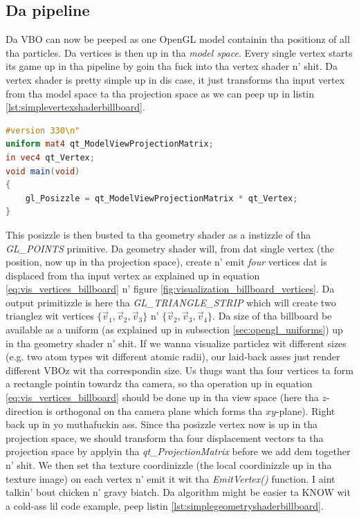 \subsection{Da pipeline}
Da VBO can now be peeped as one OpenGL model containin tha positionz of all tha particles. Da vertices is then up in tha \textit{model space}. Every single vertex starts its game up in tha pipeline by goin tha fuck into tha vertex shader n' shit. Da vertex shader is pretty simple up in dis case, it just transforms tha input vertex from tha model space ta tha projection space as we can peep up in listin \ref{lst:simplevertexshaderbillboard}.
\begin{lstlisting}[caption=billboardVertexShader.glsl, label=lst:simplevertexshaderbillboard, language=GLSL]
#version 330\n"
uniform mat4 qt_ModelViewProjectionMatrix;
in vec4 qt_Vertex;
void main(void)
{
    gl_Posizzle = qt_ModelViewProjectionMatrix * qt_Vertex;
}
\end{lstlisting}
This posizzle is then busted ta tha geometry shader as a instizzle of tha \textit{GL\_POINTS} primitive. Da geometry shader will, from dat single vertex (the position, now up in tha projection space), create n' emit \textit{four} vertices dat is displaced from tha input vertex as explained up in equation \eqref{eq:vis_vertices_billboard} n' figure \ref{fig:visualization_billboard_vertices}. Da output primitizzle is here tha \textit{GL\_TRIANGLE\_STRIP} which will create two trianglez wit vertices $\{\vec v_1, \vec v_2, \vec v_3\}$ n' $\{\vec v_2, \vec v_3, \vec v_4\}$. Da size of tha billboard be available as a uniform (as explained up in subsection \ref{sec:opengl_uniforms}) up in tha geometry shader n' shit. If we wanna visualize particlez wit different sizes (e.g. two atom types wit different atomic radii), our laid-back asses just render different VBOz wit tha correspondin size. Us thugs want tha four vertices ta form a rectangle pointin towardz tha camera, so tha operation up in equation \eqref{eq:vis_vertices_billboard} should be done up in tha view space (here tha $z$-direction is orthogonal on tha camera plane which forms tha $xy$-plane). Right back up in yo muthafuckin ass. Since tha posizzle vertex now is up in tha projection space, we should transform tha four displacement vectors ta tha projection space by applyin tha \textit{qt\_ProjectionMatrix} before we add dem together n' shit. We then set tha texture coordinizzle (the local coordinizzle up in tha texture image) on each vertex n' emit it wit tha \textit{EmitVertex()} function. I aint talkin' bout chicken n' gravy biatch. Da algorithm might be easier ta KNOW wit a cold-ass lil code example, peep listin \ref{lst:simplegeometryshaderbillboard}.


